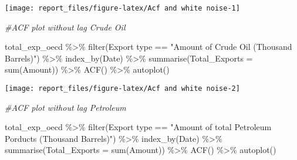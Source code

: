\documentclass[
]{article}
\newenvironment{Shaded}{\begin{snugshade}}{\end{snugshade}}
\newcommand{\AttributeTok}[1]{\textcolor[rgb]{0.77,0.63,0.00}{#1}}
\newcommand{\CommentTok}[1]{\textcolor[rgb]{0.56,0.35,0.01}{\textit{#1}}}
\newcommand{\FunctionTok}[1]{\textcolor[rgb]{0.00,0.00,0.00}{#1}}
\newcommand{\NormalTok}[1]{#1}
\newcommand{\SpecialCharTok}[1]{\textcolor[rgb]{0.00,0.00,0.00}{#1}}
\newcommand{\StringTok}[1]{\textcolor[rgb]{0.31,0.60,0.02}{#1}}
\begin{document}
\begin{center}\texttt{[image: report\_files/figure-latex/Acf and white noise-1]} \end{center}

\begin{Shaded}
\begin{Highlighting}[]
\CommentTok{\#ACF plot without lag Crude Oil}

\NormalTok{total\_exp\_oecd }\SpecialCharTok{\%\textgreater{}\%} \FunctionTok{filter}\NormalTok{(}\StringTok{\textasciigrave{}}\AttributeTok{Export type}\StringTok{\textasciigrave{}} \SpecialCharTok{==} \StringTok{"Amount of Crude Oil (Thousand Barrels)"}\NormalTok{) }\SpecialCharTok{\%\textgreater{}\%} 
  \FunctionTok{index\_by}\NormalTok{(Date) }\SpecialCharTok{\%\textgreater{}\%} 
  \FunctionTok{summarise}\NormalTok{(}\AttributeTok{Total\_Exports =} \FunctionTok{sum}\NormalTok{(}\StringTok{\textasciigrave{}}\AttributeTok{Amount}\StringTok{\textasciigrave{}}\NormalTok{)) }\SpecialCharTok{\%\textgreater{}\%} 
  \FunctionTok{ACF}\NormalTok{() }\SpecialCharTok{\%\textgreater{}\%}  \FunctionTok{autoplot}\NormalTok{()}
\end{Highlighting}
\end{Shaded}

\begin{center}\texttt{[image: report\_files/figure-latex/Acf and white noise-2]} \end{center}

\begin{Shaded}
\begin{Highlighting}[]
\CommentTok{\#ACF plot without lag Petroleum}

\NormalTok{total\_exp\_oecd }\SpecialCharTok{\%\textgreater{}\%} \FunctionTok{filter}\NormalTok{(}\StringTok{\textasciigrave{}}\AttributeTok{Export type}\StringTok{\textasciigrave{}} \SpecialCharTok{==} \StringTok{"Amount of total Petroleum Porducts (Thousand Barrels)"}\NormalTok{) }\SpecialCharTok{\%\textgreater{}\%} 
  \FunctionTok{index\_by}\NormalTok{(Date) }\SpecialCharTok{\%\textgreater{}\%} 
  \FunctionTok{summarise}\NormalTok{(}\AttributeTok{Total\_Exports =} \FunctionTok{sum}\NormalTok{(}\StringTok{\textasciigrave{}}\AttributeTok{Amount}\StringTok{\textasciigrave{}}\NormalTok{)) }\SpecialCharTok{\%\textgreater{}\%} 
  \FunctionTok{ACF}\NormalTok{() }\SpecialCharTok{\%\textgreater{}\%}  \FunctionTok{autoplot}\NormalTok{()}
\end{Highlighting}
\end{Shaded}
\end{document}
